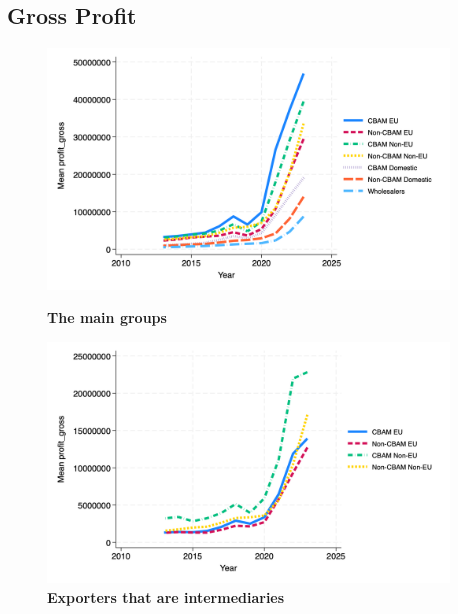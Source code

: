 \documentclass{article}
\begin{document}
\subsection{Gross Profit}
\begin{figure}[H]
\centering
\includegraphics[width=0.95\textwidth]{profit_gross_main_groups.png}
\caption{\textbf{The main groups}}
\includegraphics[width=0.95\textwidth]{profit_gross_ei.png}
\caption{\textbf{Exporters that are intermediaries}}
\end{figure}
\end{document}
